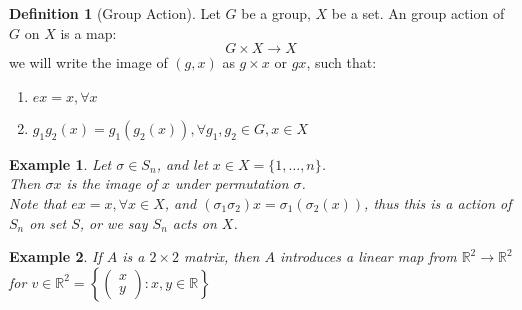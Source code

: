 \documentclass{article}
\theoremstyle{MyNonumberplain}
\theoremstyle{break}
\theoremstyle{break}
\newtheorem{example}{Example}[section]
\theoremstyle{break}
\theoremstyle{definition}
\theoremstyle{break}
\newtheorem{definition}{Definition}[section]
\begin{document}
\begin{defbox}
\begin{definition}[Group Action]

        
        Let $G$ be a group, $X$ be a set. An group action of $G$ on $X$ is a map:
        \[ G \times X \rightarrow X \]
        we will write the image of $(g, x)$ as $g \times x$ or $g x$, such that:
        \begin{enumerate}
          \item $e x = x, \forall x$
          
          \item $g_1 g_2 (x) = g_1 (g_2 (x)), \forall g_1, g_2 \in G, x \in X$
        \end{enumerate}
      \end{definition}
\end{defbox}

\begin{expbox}
    \begin{example}
        Let $\sigma \in S_n$, and let $x \in X = \{ 1, \ldots, n \}$.\\

        Then $\sigma x$ is the image of $x$ under permutation $\sigma$.\\

        Note that $e x = x, \forall x \in X$, and $(\sigma_1 \sigma_2) x = \sigma_1
        (\sigma_2 (x))$, thus this is a action of $S_n$ on set $S$, or we say $S_n$
        acts on $X$.
    \end{example}
\end{expbox}

\begin{expbox}
    \begin{example}
        If $A$ is a $2 \times 2$ matrix, then $A$ introduces a linear map from
        $\mathbb{R}^2 \rightarrow \mathbb{R}^2$ for $v \in \mathbb{R}^2 = \left\{
        \left(\begin{array}{c}
        x\\
        y
        \end{array}\right) : x, y \in \mathbb{R} \right\}$
    \end{example}
\end{expbox}
\end{document}
